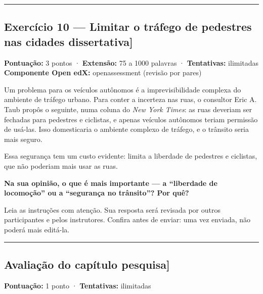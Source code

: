 \documentclass[
  11pt,
]{article}
\renewcommand{\texttt}[1]{{\color{iaAmeixa}\small\ttfamily #1}}
\begin{document}
\begin{center}\rule{0.5\linewidth}{0.5pt}\end{center}

\hypertarget{exercuxedcio-10-limitar-o-truxe1fego-de-pedestres-nas-cidades-dissertativa}{%
\subsection{\texorpdfstring{Exercício 10 --- Limitar o tráfego de
pedestres nas cidades
\texttt{{[}dissertativa{]}}}{Exercício 10 --- Limitar o tráfego de pedestres nas cidades {[}dissertativa{]}}}\label{exercuxedcio-10-limitar-o-truxe1fego-de-pedestres-nas-cidades-dissertativa}}

\textbf{Pontuação:} 3 pontos · \textbf{Extensão:} 75 a 1000 palavras ·
\textbf{Tentativas:} ilimitadas \textbf{Componente Open edX:}
\texttt{openassessment} (revisão por pares)

Um problema para os veículos autônomos é a imprevisibilidade complexa do
ambiente de tráfego urbano. Para conter a incerteza nas ruas, o
consultor Eric A. Taub propôs o seguinte, numa coluna do \emph{New York
Times}: as ruas deveriam ser fechadas para pedestres e ciclistas, e
apenas veículos autônomos teriam permissão de usá-las. Isso domesticaria
o ambiente complexo de tráfego, e o trânsito seria mais seguro.

Essa segurança tem um custo evidente: limita a liberdade de pedestres e
ciclistas, que não poderiam mais usar as ruas.

\textbf{Na sua opinião, o que é mais importante --- a ``liberdade de
locomoção'' ou a ``segurança no trânsito''? Por quê?}

Leia as instruções com atenção. Sua resposta será revisada por outros
participantes e pelos instrutores. Confira antes de enviar: uma vez
enviada, não poderá mais editá-la.

\begin{center}\rule{0.5\linewidth}{0.5pt}\end{center}

\hypertarget{avaliauxe7uxe3o-do-capuxedtulo-pesquisa}{%
\subsection{\texorpdfstring{Avaliação do capítulo
\texttt{{[}pesquisa{]}}}{Avaliação do capítulo {[}pesquisa{]}}}\label{avaliauxe7uxe3o-do-capuxedtulo-pesquisa}}

\textbf{Pontuação:} 1 ponto · \textbf{Tentativas:} ilimitadas
\end{document}
